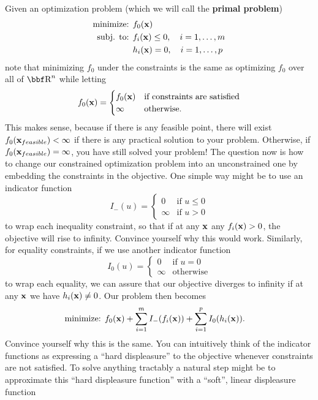\documentclass{article}
\begin{document}
Given an optimization problem (which we will call the \textbf{primal problem})
\begin{align*}
    \text{minimize: } & f_0({\bf x})\\
    \text{subj. to: } & f_i({\bf x}) \leq 0, \quad i=1,\dots,m\\
                      & h_i({\bf x}) = 0, \quad i=1,\dots,p
\end{align*}
note that minimizing $f_0$ under the constraints is the same
as optimizing $f_0$ over all of $\RR^n$ while letting
\[
    f_0({\bf x}) = \begin{cases}
        f_0({\bf x}) & \text{if constraints are satisfied}\\
        \infty   & \text{otherwise.}
    \end{cases}
\]
This makes sense, because if there is any feasible point, there will
exist $f_0({\bf x}_{feasible}) < \infty$ if there is any practical solution
to your problem. Otherwise, if $f_0({\bf x}_{feasible}) = \infty$, you have
still solved your problem! The question now is how to change our constrained
optimization problem into an unconstrained one by embedding the constraints
in the objective. One simple way might be to use an indicator function
\[
    I_-(u) = \begin{cases}
        0      & \text{if $u \leq 0$}\\
        \infty & \text{if $u > 0$}
    \end{cases}
\]
to wrap each inequality constraint, so that if at any ${\bf x}$ any $f_i({\bf x}) > 0$,
the objective will rise to infinity. Convince yourself why this would work.
Similarly, for equality constraints, if we use another indicator function
\[
    I_0(u) = \begin{cases}
        0      & \text{if $u = 0$}\\
        \infty & \text{otherwise}
    \end{cases}
\]
to wrap each equality, we can assure that our objective diverges to infinity if
at any ${\bf x}$ we have $h_i({\bf x}) \neq 0$. Our problem then becomes
\begin{align*}
    \text{minimize: } & f_0({\bf x}) + \sum_{i=1}^m I_-(f_i({\bf x})) + \sum_{i=1}^p I_0(h_i({\bf x})).
\end{align*}
Convince yourself why this is the same. You can intuitively think of the indicator
functions as expressing a ``hard displeasure'' to the objective whenever constraints
are not satisfied. To solve anything tractably a natural step might be to approximate
this ``hard displeasure function'' with a ``soft'', linear displeasure function
\end{document}
